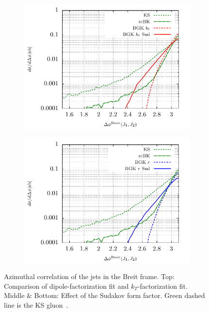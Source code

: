 \documentclass[11pt]{article}
\numberwithin{equation}{section}
\numberwithin{table}{section}
\numberwithin{figure}{section}
\begin{document}
\begin{figure}[p]
	\begin{subfigure}{0.5\textwidth}
		\includegraphics[width=\textwidth]{plots/plotBGK2Jets}
	\end{subfigure}
	\begin{subfigure}{0.5\textwidth}
		\includegraphics[width=\textwidth]{plots/plotBGK3Jets}
	\end{subfigure}
\caption{\footnotesize Azimuthal correlation of the jets in the Breit frame. Top: Comparison of dipole-factorization fit and $k_T$-factorization fit. Middle \& Bottom: Effect of the Sudakov form factor. Green dashed line is the KS gluon~\cite{vanHameren:2021sqc}. }
\label{fig:jj-breit}
\end{figure}
\end{document}
